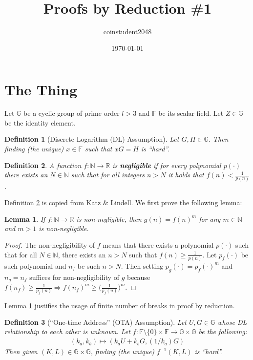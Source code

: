 \documentclass{article}
\title{Proofs by Reduction \#1}
\author{coinstudent2048}
\date{\today}
\newtheorem{definition}{Definition}[section]
\newtheorem{lemma}[theorem]{Lemma}
\begin{document}
\maketitle


\section{The Thing}
\noindent Let $\mathbb{G}$ be a cyclic group of prime order $l>3$ and $\mathbb{F}$ be its scalar field. Let $Z\in\mathbb{G}$ be the identity element.

\begin{definition}[Discrete Logarithm (DL) Assumption]
Let $G, H\in\mathbb{G}$. Then finding (the unique) $x\in\mathbb{F}$ such that $xG=H$ is ``hard''.
\end{definition}

\begin{definition}\label{negl}
A function $f:\mathbb{N}\rightarrow\mathbb{R}$ is \textbf{\em negligible} if for every polynomial $p(\cdot)$ there exists an $N\in\mathbb{N}$ such that for all integers $n>N$ it holds that $f(n)<\frac{1}{p(n)}$.
\end{definition}

\noindent Definition \ref{negl} is copied from Katz \& Lindell. We first prove the following lemma:

\begin{lemma}\label{negl-exp}
If $f:\mathbb{N}\rightarrow\mathbb{R}$ is non-negligible, then $g(n)=f(n)^m$ for any $m\in\mathbb{N}$ and $m>1$ is non-negligible.
\end{lemma}
\begin{proof}
The non-negligibility of $f$ means that there exists a polynomial $p(\cdot)$ such that for all $N\in\mathbb{N}$, there exists an $n>N$ such that $f(n)\ge\frac{1}{p(n)}$. Let $p_f(\cdot)$ be such polynomial and $n_f$ be such $n>N$. Then setting $p_g(\cdot)=p_f(\cdot)^m$ and $n_g=n_f$ suffices for non-negligibility of $g$ because $f(n_f)\ge\frac{1}{p_f(n)}\Rightarrow f(n_f)^m\ge\big(\frac{1}{p_f(n)}\big)^m$.
\end{proof}

\noindent Lemma \ref{negl-exp} justifies the usage of finite number of breaks in proof by reduction.

\begin{definition}[``One-time Address'' (OTA) Assumption]
Let $U, G\in\mathbb{G}$ whose DL relationship to each other is unknown. Let $f:\mathbb{F}\setminus\{0\}\times\mathbb{F}\rightarrow\mathbb{G}\times\mathbb{G}$ be the following:
\begin{align*}
    (k_a, k_b) \mapsto (k_a U + k_b G, (1/k_a)G)
\end{align*}
Then given $(K, L)\in\mathbb{G}\times\mathbb{G}$, finding (the unique) $f^{-1}(K,L)$ is ``hard''.
\end{definition}
\end{document}
